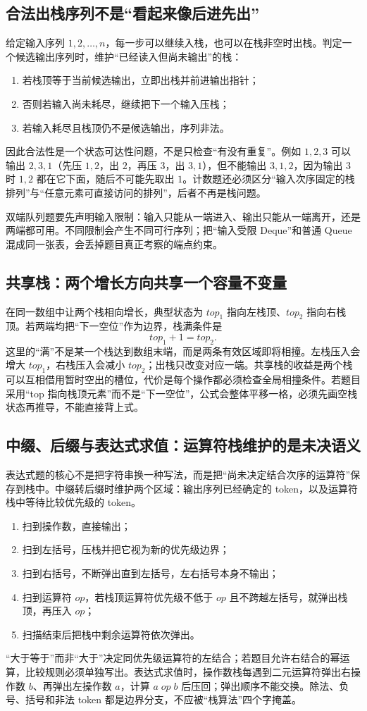 \documentclass[UTF8,fontset=none,11pt,a4paper]{ctexart}
\begin{document}
\subsection{合法出栈序列不是“看起来像后进先出”}
给定输入序列 $1,2,\ldots,n$，每一步可以继续入栈，也可以在栈非空时出栈。判定一个候选输出序列时，维护“已经读入但尚未输出”的栈：
\begin{enumerate}
\item 若栈顶等于当前候选输出，立即出栈并前进输出指针；
\item 否则若输入尚未耗尽，继续把下一个输入压栈；
\item 若输入耗尽且栈顶仍不是候选输出，序列非法。
\end{enumerate}
因此合法性是一个状态可达性问题，不是只检查“有没有重复”。例如 $1,2,3$ 可以输出 $2,3,1$（先压 $1,2$，出 $2$，再压 $3$，出 $3,1$），但不能输出 $3,1,2$，因为输出 $3$ 时 $1,2$ 都在它下面，随后不可能先取出 $1$。计数题还必须区分“输入次序固定的栈排列”与“任意元素可直接访问的排列”，后者不再是栈问题。

双端队列题要先声明输入限制：输入只能从一端进入、输出只能从一端离开，还是两端都可用。不同限制会产生不同可行序列；把“输入受限 Deque”和普通 Queue 混成同一张表，会丢掉题目真正考察的端点约束。

\subsection{共享栈：两个增长方向共享一个容量不变量}
在同一数组中让两个栈相向增长，典型状态为 $top_1$ 指向左栈顶、$top_2$ 指向右栈顶。若两端均把“下一空位”作为边界，栈满条件是
\[
top_1+1=top_2.
\]
这里的“满”不是某一个栈达到数组末端，而是两条有效区域即将相撞。左栈压入会增大 $top_1$，右栈压入会减小 $top_2$；出栈只改变对应一端。共享栈的收益是两个栈可以互相借用暂时空出的槽位，代价是每个操作都必须检查全局相撞条件。若题目采用“top 指向栈顶元素”而不是“下一空位”，公式会整体平移一格，必须先画空栈状态再推导，不能直接背上式。

\subsection{中缀、后缀与表达式求值：运算符栈维护的是未决语义}
表达式题的核心不是把字符串换一种写法，而是把“尚未决定结合次序的运算符”保存到栈中。中缀转后缀时维护两个区域：输出序列已经确定的 token，以及运算符栈中等待比较优先级的 token。
\begin{enumerate}
\item 扫到操作数，直接输出；
\item 扫到左括号，压栈并把它视为新的优先级边界；
\item 扫到右括号，不断弹出直到左括号，左右括号本身不输出；
\item 扫到运算符 $op$，若栈顶运算符优先级不低于 $op$ 且不跨越左括号，就弹出栈顶，再压入 $op$；
\item 扫描结束后把栈中剩余运算符依次弹出。
\end{enumerate}
“大于等于”而非“大于”决定同优先级运算符的左结合；若题目允许右结合的幂运算，比较规则必须单独写出。表达式求值时，操作数栈每遇到二元运算符弹出右操作数 $b$、再弹出左操作数 $a$，计算 $a\;op\;b$ 后压回；弹出顺序不能交换。除法、负号、括号和非法 token 都是边界分支，不应被“栈算法”四个字掩盖。
\end{document}
